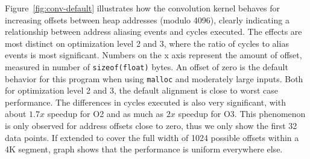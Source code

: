 \documentclass[a4paper,10pt,twocolumn,twoside]{article}
\newcommand{\perfctr}[1] {
  {\lowercase{#1}}
}
\begin{document}
{\begin{table*}[t]
  \pgfplotstabletypeset[
    font=\small,
    int detect, %
    col sep=comma,
    columns={Performance counter, Correlation, 0, 2, 4, 8},
    column type=r,
    columns/Performance counter/.style={
      string type, 
      column type=l,
      postproc cell content/.append code={
        \pgfkeysalso{@cell content=\perfctr{##1}}
      }
    },
    columns/Correlation/.style={
      fixed,
      fixed zerofill,
      precision=2
    },
    every head row/.style={
      output empty row,
      before row={\toprule
        Performance counter & $r$ & 0 & 2 & 4 & 8 \\
        },
      after row=\midrule,
    },
    every last row/.style={after row=\bottomrule}
  ]{bin/conv-default-o2.estimate.csv}
\end{table*}

Figure~\ref{fig:conv-default} illustrates how the convolution kernel behaves for increasing offsets between heap addresses (modulo 4096), clearly indicating a relationship between address aliasing events and cycles executed.
The effects are most distinct on optimization level 2 and 3, where the ratio of cycles to alias events is most significant.
Numbers on the x axis represent the amount of offset, measured in number of \texttt{sizeof(float)} bytes.
An offset of zero is the default behavior for this program when using \texttt{malloc} and moderately large inputs.
Both for optimization level 2 and 3, the default alignment is close to worst case performance.
The differences in cycles executed is also very significant, with about $1.7x$ speedup for O2 and as much as $2x$ speedup for O3.
This phenomenon is only observed for address offsets close to zero, thus we only show the first 32 data points.
If extended to cover the full width of 1024 possible offsets within a 4K segment, graph shows that the performance is uniform everywhere else.

}
\end{document}
